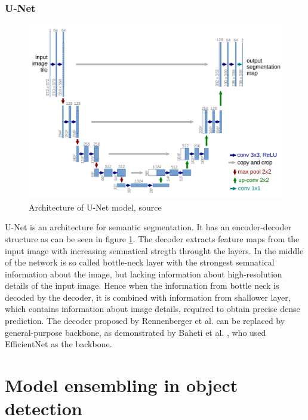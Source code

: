 \subsubsection{U-Net}
\begin{figure}
    \centering
    \includegraphics[width=\linewidth]{images/U-Net.png}
    \caption{Architecture of U-Net model, source \cite{Ronneberger2015}}
    \label{fig:unet_architecture}
\end{figure}
U-Net is an architecture for semantic segmentation. It has an encoder-decoder structure as can be seen in figure \ref{fig:unet_architecture}. The decoder extracts feature maps from the input image with increasing semnatical stregth throught the layers. In the middle of the network is so called bottle-neck layer with the strongest semnatical information about the image, but lacking information about high-resolution details of the input image. Hence when the information from bottle neck is decoded by the decoder, it is combined with information from shallower layer, which contains information about image details, required to obtain precise dense prediction.
\newline
The decoder proposed by Rennenberger et al. \cite{Ronneberger2015} can be replaced by general-purpose backbone, as demonstrated by Baheti et al. \cite{Baheti2020}, who used EfficientNet as the backbone.

\section{Model ensembling in object detection}

